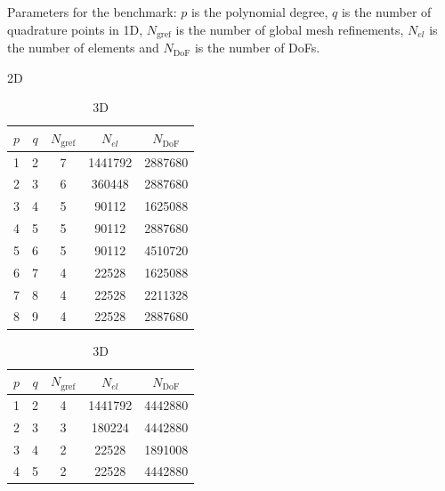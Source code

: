 \documentclass[AMA,STIX1COL]{WileyNJD-v2}
\begin{document}
%
\begin{table}[!htb]
  \caption{Parameters for the benchmark: $p$ is the polynomial degree,
  $q$ is the number of quadrature points in 1D, $N_{\text{gref}}$ is the number of global mesh refinements, $N_{el}$ is the number of elements and $N_{\text{DoF}}$ is the number of DoFs.}
  \begin{subtable}{.5\linewidth}
  \caption{2D}
  \label{tab:input_parameters_2d}
  \centering
  \begin{tabular}{ccccc}
  \hline
    $p$ & $q$ & $N_{\text{gref}}$ & $N_{el}$ & $N_{\text{DoF}}$ \\
  \hline
    1 & 2 & 7 & 1441792 & 2887680 \\
    2 & 3 & 6 & 360448 & 2887680 \\
    3 & 4 & 5 & 90112 & 1625088 \\
    4 & 5 & 5 & 90112 & 2887680 \\
    5 & 6 & 5 & 90112 & 4510720 \\
    6 & 7 & 4 & 22528 & 1625088 \\
    7 & 8 & 4 & 22528 & 2211328 \\
    8 & 9 & 4 & 22528 & 2887680 \\
  \hline
  \end{tabular}
  \end{subtable}
  \begin{subtable}{.5\linewidth}
  \caption{3D}
  \label{tab:input_parameters_3d}
  \centering
  \begin{tabular}{ccccc}
  \hline
    $p$ & $q$ & $N_{\text{gref}}$ & $N_{el}$ & $N_{\text{DoF}}$ \\
  \hline
    1 & 2 & 4 & 1441792 & 4442880 \\
    2 & 3 & 3 & 180224 & 4442880 \\
    3 & 4 & 2 & 22528 & 1891008 \\
    4 & 5 & 2 & 22528 & 4442880 \\
  \hline
  \end{tabular}
  \end{subtable}
\end{table}
\end{document}
